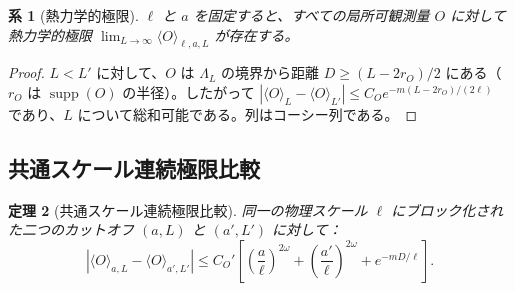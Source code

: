 \documentclass[12pt]{article}
\theoremstyle{plain}
\newtheorem{theorem}{定理}[section]
\newtheorem{corollary}[theorem]{系}
\theoremstyle{definition}
\numberwithin{equation}{section}
\newcommand{\supp}{\operatorname{supp}}
\begin{document}
\begin{corollary}[熱力学的極限]\label{cor:thermolimit}
$\ell$ と $a$ を固定すると、すべての局所可観測量 $O$ に対して熱力学的極限 $\lim_{L\to\infty}\langle O\rangle_{\ell,a,L}$ が存在する。
\end{corollary}

\begin{proof}
$L<L'$ に対して、$O$ は $\Lambda_L$ の境界から距離 $D\geq(L-2r_O)/2$ にある（$r_O$ は $\supp(O)$ の半径）。したがって $|\langle O\rangle_L-\langle O\rangle_{L'}|\leq C_O e^{-m(L-2r_O)/(2\ell)}$ であり、$L$ について総和可能である。列はコーシー列である。
\end{proof}

\subsection{共通スケール連続極限比較}

\begin{theorem}[共通スケール連続極限比較]\label{thm:commonscale}
同一の物理スケール $\ell$ にブロック化された二つのカットオフ $(a,L)$ と $(a',L')$ に対して：
\begin{equation}
\left|\langle O\rangle_{a,L}-\langle O\rangle_{a',L'}\right|
\leq C_O'\left[\left(\frac{a}{\ell}\right)^{2\omega}+\left(\frac{a'}{\ell}\right)^{2\omega}+e^{-mD/\ell}\right].
\end{equation}
\end{theorem}
\end{document}
